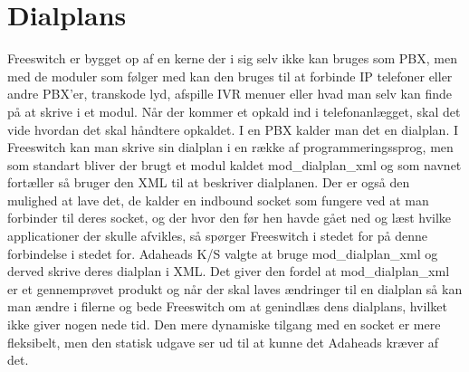 \section{Dialplans}
Freeswitch er bygget op af en kerne der i sig selv ikke kan bruges som PBX, men med de moduler som følger med kan den bruges til at forbinde IP telefoner eller andre PBX'er, transkode lyd, afspille IVR menuer eller hvad man selv kan finde på at skrive i et modul.
Når der kommer et opkald ind i telefonanlægget, skal det vide hvordan det skal håndtere opkaldet. I en PBX kalder man det en dialplan.  
I Freeswitch kan man skrive sin dialplan i en række af programmeringssprog, men som standart bliver der brugt et modul kaldet mod\_dialplan\_xml og som navnet fortæller så bruger den XML til at beskriver dialplanen. Der er også den mulighed at lave det, de kalder en indbound socket som fungere ved at man forbinder til deres socket, og der hvor den før hen havde gået ned og læst hvilke applicationer der skulle afvikles, så spørger Freeswitch i stedet for på denne forbindelse i stedet for. Adaheads K/S valgte at bruge mod\_dialplan\_xml og derved skrive deres dialplan i XML. Det giver den fordel at mod\_dialplan\_xml er et gennemprøvet produkt og når der skal laves ændringer til en dialplan så kan man ændre i filerne og bede Freeswitch om at genindlæs dens dialplans, hvilket ikke giver nogen nede tid. Den mere dynamiske tilgang med en socket er mere fleksibelt, men den statisk udgave ser ud til at kunne det Adaheads kræver af det.

